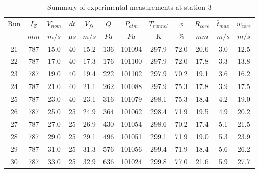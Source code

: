 \begin{table}[H]
\begin{center}
\begin{tabular}{|cccccccccccc|}
	\hline
	Run & $I_Z$ & $V_{nom}$ & $dt$ & $V_{fs}$ & $Q$ & $P_{atm}$ & $T_{tunnel}$ & $\phi$ & $R_{core}$ & $\overline{t}_{max}$ & $\overline{w}_{core}$\\
	  & $mm$ & $m/s$ & $\mu s$ & $m/s$ & $Pa$ & $Pa$ & K & $\%$ & $mm$ & $m/s$ & $m/s$\\
	\hline
	21 & 787 & 15.0 & 40 & 15.2 & 136 & 101094 & 297.9 & 72.0 & 20.6 & 3.0 & 12.5\\
	22 & 787 & 17.0 & 40 & 17.3 & 176 & 101100 & 297.9 & 72.0 & 17.8 & 3.3 & 13.8\\
	23 & 787 & 19.0 & 40 & 19.4 & 222 & 101102 & 297.9 & 70.2 & 19.1 & 3.6 & 16.2\\
	24 & 787 & 21.0 & 40 & 21.1 & 262 & 101088 & 297.9 & 75.3 & 17.8 & 3.9 & 17.5\\
	25 & 787 & 23.0 & 40 & 23.1 & 316 & 101079 & 298.1 & 75.3 & 18.4 & 4.2 & 19.0\\
	26 & 787 & 25.0 & 25 & 24.9 & 364 & 101062 & 298.4 & 71.9 & 19.5 & 4.9 & 20.2\\
	27 & 787 & 27.0 & 25 & 26.9 & 430 & 101054 & 298.6 & 70.2 & 17.4 & 5.1 & 21.5\\
	28 & 787 & 29.0 & 25 & 29.1 & 496 & 101051 & 299.1 & 71.9 & 19.0 & 5.3 & 23.9\\
	29 & 787 & 31.0 & 25 & 31.3 & 576 & 101056 & 299.4 & 71.9 & 18.4 & 5.6 & 26.2\\
	30 & 787 & 33.0 & 25 & 32.9 & 636 & 101024 & 299.8 & 77.0 & 21.6 & 5.9 & 27.7\\
	\hline
\end{tabular}
\caption{Summary of experimental measurements at station 3}
\label{table:experiment_results_3}
\end{center}
\end{table}
